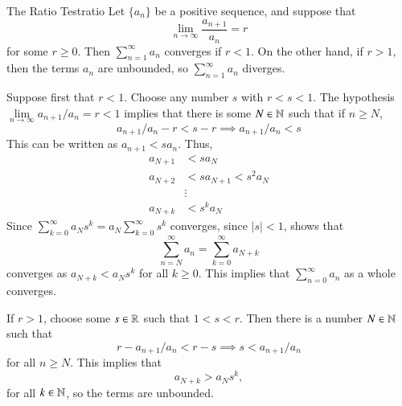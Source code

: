 \documentclass[12pt]{report}
\begin{document}
\begin{namthm}{The Ratio Test}{ratio}
    Let $\{a_n\}$ be a positive sequence, and suppose that \begin{equation*}
        \lim\limits_{n\rightarrow \infty}\frac{a_{n+1}}{a_n} = r
    \end{equation*}
    for some $r \geq 0$. Then $\sum\limits_{n=1}^{\infty}a_n$ converges if $r < 1$. On the other hand, if $r > 1$, then the terms $a_n$ are unbounded, so $\sum\limits_{n=1}^{\infty}a_n$ diverges.
\end{namthm}
\begin{proof*}{}{}
    Suppose first that $r<1$. Choose any number $s$ with $r < s < 1$. The hypothesis $\lim\limits_{n\rightarrow \infty}a_{n+1}/a_n = r < 1$ implies that there is some $N \in \mathbb N$ such that if $n \geq N$, \begin{equation*}
        a_{n+1}/a_n - r < s-r \implies a_{n+1}/a_n < s
    \end{equation*}
    This can be written as $a_{n+1} < sa_n$. Thus, \begin{align*}
        a_{N+1} &< sa_N \\
        a_{N+2} &< sa_{N+1} < s^2a_N \\
        &\vdots \\
        a_{N+k} &< s^ka_N
    \end{align*}
    Since $\sum\limits_{k=0}^{\infty}a_Ns^k = a_N\sum\limits_{k=0}^{\infty}s^k$ converges, since $|s| < 1$,  shows that \begin{equation*}
        \sum\limits_{n=N}^{\infty}a_n = \sum\limits_{k=0}^{\infty}a_{N+k}
    \end{equation*}
    converges as $a_{N+k} < a_Ns^k$ for all $k \geq 0$. This implies that $\sum\limits_{n=0}^{\infty}a_n$ as a whole converges.

    If $r > 1$, choose some $s \in \mathbb R$ such that $1 < s < r$. Then there is a number $N \in \mathbb N$ such that \begin{equation*}
        r - a_{n+1}/a_n < r-s \implies s < a_{n+1}/a_n
    \end{equation*}
    for all $n \geq N$. This implies that \begin{equation*}
        a_{N+k} > a_Ns^k,
    \end{equation*}
    for all $k \in \mathbb N$, so the terms are unbounded.
\end{proof*}
\end{document}
